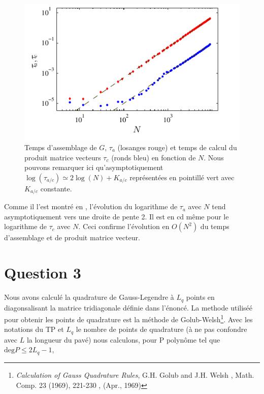 \documentclass[10pt]{article}
\begin{document}
\begin{multicols}{2}
\begin{figure}[H]
  \begin{center}
  \includegraphics[width=0.95\columnwidth]{Q2b_4.pdf}
  \vspace*{-11pt}
  \caption{Temps d'assemblage de $G$, $\tau_a$ (losanges rouge) et temps de calcul du produit matrice vecteurs $\tau_c$  (ronds bleu) en fonction de $N$. Nous pouvons remarquer ici qu'asymptotiquement $\log(\tau_{a/c}) \simeq 2\log(N)+K_{a/c}$ représentées en pointillé vert avec $K_{a/c}$ constante.}
  \label{fig:Q2b} 
  \end{center}
\end{figure}
\vspace*{-22pt}

Comme il l'est montré en , l'évolution du logarithme de $\tau_a$ avec $N$ tend asymptotiquement vers une droite de pente 2. Il est en cd même pour le logarithme de $\tau_c$ avec $N$. Ceci confirme l'évolution en $O(N^{2})$ du temps d'assemblage et de produit matrice vecteur.



\vspace*{22pt}

\section*{Question 3}

Nous avons calculé la quadrature de Gauss-Legendre à $L_q$ points en diagonsalisant la matrice tridiagonale définie dans l'énoncé. La methode utiliséé pour obtenir les points de quadrature est la méthode de Golub-Welsh\footnote{\textit{Calculation of Gauss Quadrature Rules}, G.H. Golub and J.H. Welsh \color{cyan}, Math. Comp. 23 (1969), 221-230 \color{black}, (Apr., 1969)}. Avec les notations du TP et $L_q$ le nombre de points de quadrature (à ne pas confondre avec $L$ la longueur du pavé) nous calculons, pour P polynôme tel que $\text{deg}P \le 2L_q-1$,


\end{multicols}
\end{document}
